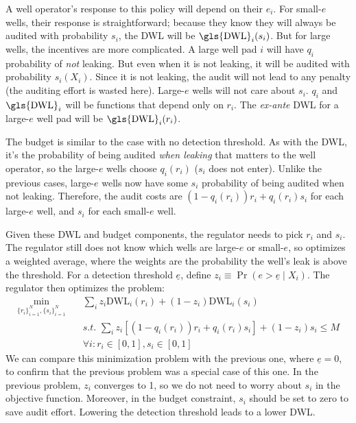 \documentclass[12pt,oneside,letterpaper]{article}
\theoremstyle{definition}
\begin{document}
\begin{refsection}
A well operator's response to this policy will depend on their \(e_i\).
For small-\(e\) wells, their response is straightforward; because they know they will always be audited with probability \(s_i\), the \gls{DWL} will be \(\text{\gls{DWL}}_i(s_i)\).
But for large wells, the incentives are more complicated.
A large well pad \(i\) will have \(q_i\) probability of \textit{not} leaking.
But even when it is not leaking, it will be audited with probability \(s_i(X_i)\).
Since it is not leaking, the audit will not lead to any penalty
(the auditing effort is wasted here).
Large-\(e\) wells will not care about \(s_i\).
\(q_i\) and \(\text{\gls{DWL}}_i\) will be functions that depend only on \(r_i\).
The \textit{ex-ante} \gls{DWL} for a large-\(e\) well pad will be
\(\text{\gls{DWL}}_i(r_i)\).

The budget is similar to the case with no detection threshold.
As with the \gls{DWL}, it's the probability of being audited \emph{when leaking} that matters to the well operator, so the large-\(e\) wells choose \(q_i(r_i)\) (\(s_i\) does not enter).
Unlike the previous cases, large-\(e\) wells now have some \(s_i\) probability of being audited when not leaking.
Therefore, the audit costs are \((1 - q_i(r_i)) r_i + q_i(r_i) s_i\) for each large-\(e\) well, and \(s_i\) for each small-\(e\) well.

Given these \gls{DWL} and budget components, the regulator needs to pick \(r_i\) and \(s_i\).
The regulator still does not know which wells are large-\(e\) or small-\(e\), so optimizes a weighted average, where the weights are the probability the well's leak is above the threshold.
For a detection threshold \(\underline{e}\), define
\(z_i \equiv \Pr(e > \underline{e} \mid X_i)\).
The regulator then optimizes the problem:
\begin{align*}
\min_{
\{r_i\}_{i = 1} ^ N, \{s_i\}_{i = 1} ^ N
} \quad &
\sum_i
z_i  \text{DWL}_i(r_i) +
(1 - z_i ) \text{DWL}_i(s_i)\\
&\textit{s.t. }
\sum_i
z_i [(1 - q_i(r_i)) r_i + q_i(r_i) s_i] +
(1 - z_i) s_i
\leq M\\
&\forall i: r_i \in [0, 1], s_i \in [0, 1]
\end{align*}
We can compare this minimization problem with the previous one, where \(\underline{e} = 0\), to confirm that the previous problem was a special case of this one.
In the previous problem, \(z_i\) converges to 1, so we do not need to worry about \(s_i\) in the objective function.
Moreover, in the budget constraint, \(s_i\) should be set to zero to save audit effort.
Lowering the detection threshold leads to a lower \gls{DWL}.



\end{refsection}
\end{document}
